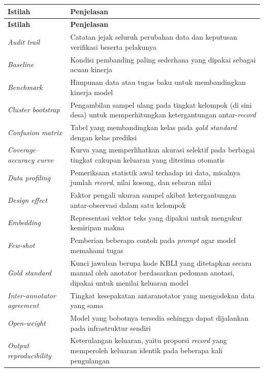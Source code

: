 {\footnotesize
\setlength{\tabcolsep}{4pt}
\renewcommand{\arraystretch}{1.05}
\begin{longtable}{|L{0.27\textwidth}|L{0.62\textwidth}|}
\hline
\textbf{Istilah} & \textbf{Penjelasan} \\ \hline
\endfirsthead
\hline
\textbf{Istilah} & \textbf{Penjelasan} \\ \hline
\endhead
\textit{Audit trail} & Catatan jejak seluruh perubahan data dan keputusan verifikasi beserta pelakunya \\ \hline
\textit{Baseline} & Kondisi pembanding paling sederhana yang dipakai sebagai acuan kinerja \\ \hline
\textit{Benchmark} & Himpunan data atau tugas baku untuk membandingkan kinerja model \\ \hline
\textit{Cluster bootstrap} & Pengambilan sampel ulang pada tingkat kelompok (di sini desa) untuk memperhitungkan ketergantungan antar-\textit{record} \\ \hline
\textit{Confusion matrix} & Tabel yang membandingkan kelas pada \textit{gold standard} dengan kelas prediksi \\ \hline
\textit{Coverage--accuracy curve} & Kurva yang memperlihatkan akurasi selektif pada berbagai tingkat cakupan keluaran yang diterima otomatis \\ \hline
\textit{Data profiling} & Pemeriksaan statistik awal terhadap isi data, misalnya jumlah \textit{record}, nilai kosong, dan sebaran nilai \\ \hline
\textit{Design effect} & Faktor pengali ukuran sampel akibat ketergantungan antar-observasi dalam satu kelompok \\ \hline
\textit{Embedding} & Representasi vektor teks yang dipakai untuk mengukur kemiripan makna \\ \hline
\textit{Few-shot} & Pemberian beberapa contoh pada \textit{prompt} agar model memahami tugas \\ \hline
\textit{Gold standard} & Kunci jawaban berupa kode KBLI yang ditetapkan secara manual oleh anotator berdasarkan pedoman anotasi, dipakai untuk menilai keluaran model \\ \hline
\textit{Inter-annotator agreement} & Tingkat kesepakatan antaranotator yang mengodekan data yang sama \\ \hline
\textit{Open-weight} & Model yang bobotnya tersedia sehingga dapat dijalankan pada infrastruktur sendiri \\ \hline
\textit{Output reproducibility} & Keterulangan keluaran, yaitu proporsi \textit{record} yang memperoleh keluaran identik pada beberapa kali pengulangan \\ \hline

\end{longtable}}
